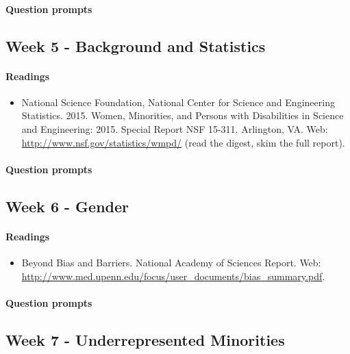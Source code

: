 \documentclass{article}
\begin{document}
\paragraph{Question prompts}


\subsection{Week 5 - Background and Statistics}
\paragraph{Readings}
\begin{itemize}
\item National Science Foundation, National Center for Science and Engineering Statistics. 2015. Women, Minorities, and Persons with Disabilities in Science and Engineering: 2015. Special Report NSF 15-311. Arlington, VA. Web: \url{http://www.nsf.gov/statistics/wmpd/} (read the digest, skim the full report).
\end{itemize}
\paragraph{Question prompts}


\subsection{Week 6 - Gender}
\paragraph{Readings}
\begin{itemize}
\item Beyond Bias and Barriers. National Academy of Sciences Report. Web: \url{http://www.med.upenn.edu/focus/user_documents/bias_summary.pdf}.
\end{itemize}
\paragraph{Question prompts}


\subsection{Week 7 - Underrepresented Minorities}
\end{document}
